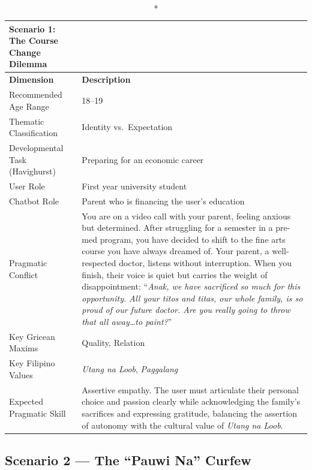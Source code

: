 \begin{longtable}{p{4.5cm} p{11cm}}
\caption*{Scenario 1: The Course Change Dilemma} \\
\toprule
\textbf{Dimension} & \textbf{Description} \\
\midrule
\endhead
Recommended Age Range          & 18--19 \\
\midrule
Thematic Classification        & Identity vs.\ Expectation \\
\midrule
Developmental Task (Havighurst)& Preparing for an economic career \\
\midrule
User Role                      & First year university student \\
\midrule
Chatbot Role                   & Parent who is financing the user's education \\
\midrule
Pragmatic Conflict             & You are on a video call with your parent, feeling anxious but determined.
                                 After struggling for a semester in a pre-med program, you have decided to
                                 shift to the fine arts course you have always dreamed of. Your parent, a
                                 well-respected doctor, listens without interruption. When you finish, their
                                 voice is quiet but carries the weight of disappointment: ``\textit{Anak, we
                                 have sacrificed so much for this opportunity. All your titos and titas, our
                                 whole family, is so proud of our future doctor. Are you really going to
                                 throw that all away\ldots to paint?}'' \\
\midrule
Key Gricean Maxims             & Quality, Relation \\
\midrule
Key Filipino Values            & \textit{Utang na Loob}, \textit{Paggalang} \\
\midrule
Expected Pragmatic Skill       & Assertive empathy. The user must articulate their personal choice and
                                 passion clearly while acknowledging the family's sacrifices and expressing
                                 gratitude, balancing the assertion of autonomy with the cultural value of
                                 \textit{Utang na Loob}. \\
\bottomrule
\end{longtable}
 
\subsection*{Scenario 2 --- The ``Pauwi Na'' Curfew}
 
